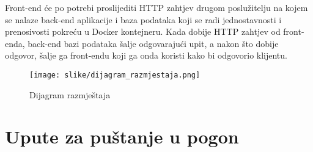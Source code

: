 			 Front-end će po potrebi proslijediti HTTP zahtjev drugom poslužitelju na kojem se nalaze back-end aplikacije i baza podataka koji se radi jednostavnosti i prenosivosti pokreću u Docker kontejneru. Kada dobije HTTP zahtjev od front-enda, back-end bazi podataka šalje odgovarajući upit, a nakon što dobije odgovor, šalje ga front-endu koji ga onda koristi kako bi odgovorio klijentu.
			\begin{figure}[H]
				\texttt{[image: slike/dijagram\_razmjestaja.png]} %
				\centering
				\caption{Dijagram razmještaja}
				\label{fig:Dijagram razmještaja}
			\end{figure}
			\eject 
		
		\section{Upute za puštanje u pogon}
		
		
			
			
